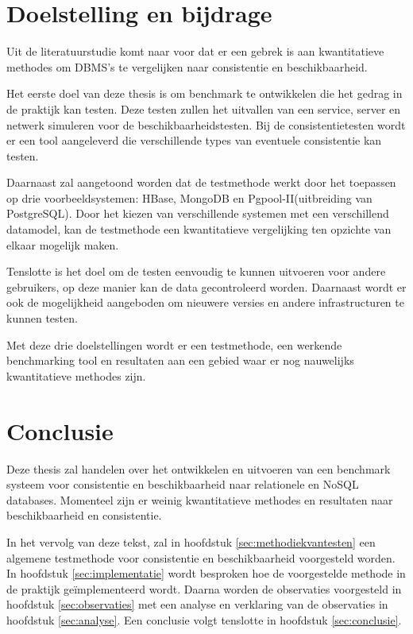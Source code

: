 \section{Doelstelling en bijdrage}
Uit de literatuurstudie komt naar voor dat er een gebrek is aan kwantitatieve methodes om DBMS's te vergelijken naar consistentie en beschikbaarheid. 

Het eerste doel van deze thesis is om benchmark te ontwikkelen die het gedrag in de praktijk kan testen. Deze testen zullen het uitvallen van een service, server en netwerk simuleren voor de beschikbaarheidstesten. Bij de consistentietesten wordt er een tool aangeleverd die verschillende types van eventuele consistentie kan testen. 

Daarnaast zal aangetoond worden dat de testmethode werkt door het toepassen op drie voorbeeldsystemen: HBase, MongoDB en Pgpool-II(uitbreiding van PostgreSQL). Door het kiezen van verschillende systemen met een verschillend datamodel, kan de testmethode een kwantitatieve vergelijking ten opzichte van elkaar mogelijk maken. 

Tenslotte is het doel om de testen eenvoudig te kunnen uitvoeren voor andere gebruikers, op deze manier kan de data gecontroleerd worden. Daarnaast wordt er ook de mogelijkheid aangeboden om nieuwere versies en andere infrastructuren te kunnen testen.

Met deze drie doelstellingen wordt er een testmethode, een werkende benchmarking tool en resultaten aan een gebied waar er nog nauwelijks kwantitatieve methodes zijn. 

\section{Conclusie}
Deze thesis zal handelen over het ontwikkelen en uitvoeren van een benchmark systeem voor consistentie en beschikbaarheid naar relationele en NoSQL databases. Momenteel zijn er weinig kwantitatieve methodes en resultaten naar beschikbaarheid en consistentie.  

In het vervolg van deze tekst, zal in hoofdstuk \ref{sec:methodiekvantesten} een algemene testmethode voor consistentie en beschikbaarheid voorgesteld worden. In hoofdstuk \ref{sec:implementatie} wordt besproken hoe de voorgestelde methode in de praktijk geïmplementeerd wordt. Daarna worden de observaties voorgesteld in hoofdstuk \ref{sec:observaties} met een analyse en verklaring van de observaties in hoofdstuk \ref{sec:analyse}. Een conclusie volgt tenslotte in hoofdstuk \ref{sec:conclusie}. 